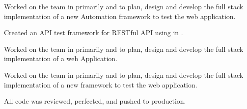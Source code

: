 \documentclass[]{openfont}
\begin{document}
\begin{minipage}[t]{0.66\textwidth}
\begin{tightemize}
\item Worked on the \href{https://www.xpo.com/solutions/transportation/last-mile}{} team in primarily  and  to plan, design and develop the full stack implementation of a new Automation framework to test the web application.
\item Created an API test framework for RESTful API using  in .
\end{tightemize}
\sectionsep

\begin{tightemize}
\item Worked on the  team in primarily  and  to plan, design and develop the full stack implementation of a web Application.
\item Worked on the   team in primarily  and  to plan, design and develop the full stack implementation of a new framework to test the web application.
\item All code was reviewed, perfected, and pushed to production.
\end{tightemize}
\sectionsep




\end{minipage}
\end{document}
